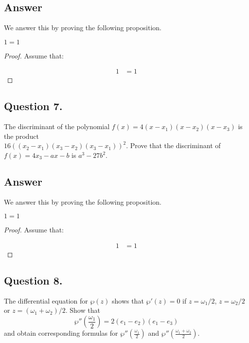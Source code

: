 \subsection*{Answer}
\noindent
We answer this by proving the following proposition.

\begin{proposition}
    $1=1$
\end{proposition}

\begin{proof}
    Assume that:

    \begin{align*}
        1 &= 1
    \end{align*}

\end{proof}


\subsection{Question 7.}
\noindent
The discriminant of the polynomial $f(x) = 4(x - x_1)(x - x_2)(x - x_3)$ is the product \\
$16((x_2 - x_1)(x_3 - x_2)(x_3 - x_1))^2$. Prove that the discriminant of $f(x) =  4x_3 - a x - b$ is $a^3 - 27b^2$.

\subsection*{Answer}
\noindent
We answer this by proving the following proposition.

\begin{proposition}
    $1=1$
\end{proposition}

\begin{proof}
    Assume that:

    \begin{align*}
        1 &= 1
    \end{align*}

\end{proof}


\subsection{Question 8.}
\noindent
The differential equation for $\wp(z)$ shows that $\wp'(z)=0$ if $z=\omega_1 / 2$, $z=\omega_2 / 2$ or
$z=(\omega_1 + \omega_2) / 2$. Show that
\[
    \wp''(\frac{\omega_1}{2}) = 2 (e_1 - e_2)(e_1 - e_3)
\]
and obtain corresponding formulas for $\wp''(\frac{\omega_1}{2})$ and $\wp''(\frac{\omega_1 + \omega_2}{2})$.

